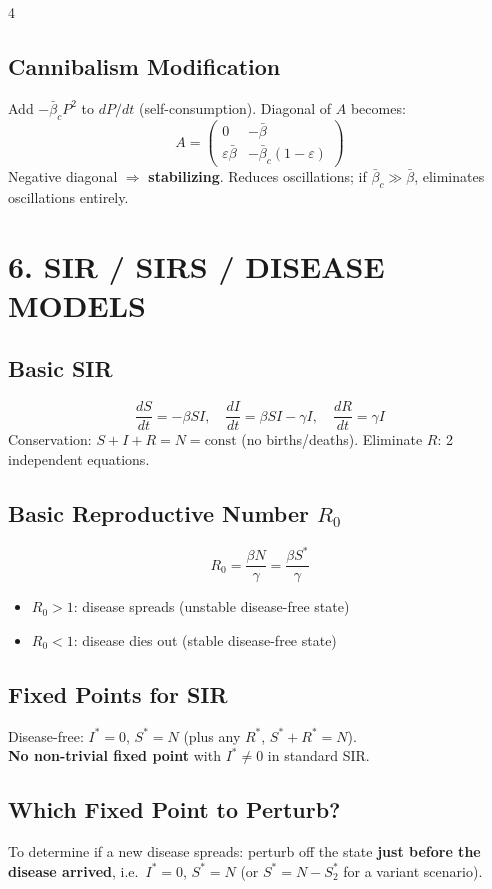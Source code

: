 \documentclass[8pt,landscape]{article}
\begin{document}
\begin{multicols}{4}
\subsection{Cannibalism Modification}
Add $-\bar{\beta}_c P^2$ to $dP/dt$ (self-consumption). Diagonal of $A$ becomes:
\[
A = \begin{pmatrix} 0 & -\bar{\beta} \\ \varepsilon\bar{\beta} & -\bar{\beta}_c(1-\varepsilon) \end{pmatrix}
\]
Negative diagonal $\Rightarrow$ \textbf{stabilizing}. Reduces oscillations; if $\bar{\beta}_c \gg \bar{\beta}$, eliminates oscillations entirely.

\section{6. SIR / SIRS / DISEASE MODELS}

\subsection{Basic SIR}
\[
\frac{dS}{dt} = -\beta SI, \quad \frac{dI}{dt} = \beta SI - \gamma I, \quad \frac{dR}{dt} = \gamma I
\]
Conservation: $S + I + R = N = \text{const}$ (no births/deaths). Eliminate $R$: 2 independent equations.

\subsection{Basic Reproductive Number $R_0$}
\[
R_0 = \frac{\beta N}{\gamma} = \frac{\beta S^*}{\gamma}
\]
\begin{itemize}
  \item $R_0 > 1$: disease spreads (unstable disease-free state)
  \item $R_0 < 1$: disease dies out (stable disease-free state)
\end{itemize}

\subsection{Fixed Points for SIR}
Disease-free: $I^* = 0$, $S^* = N$ (plus any $R^*$, $S^* + R^* = N$).\\
\textbf{No non-trivial fixed point} with $I^* \neq 0$ in standard SIR.

\subsection{Which Fixed Point to Perturb?}
To determine if a new disease spreads: perturb off the state \textbf{just before the disease arrived}, i.e.\ $I^* = 0$, $S^* = N$ (or $S^* = N - S_2^*$ for a variant scenario).


\end{multicols}
\end{document}
